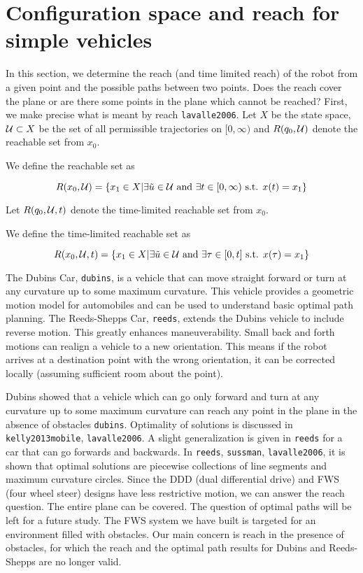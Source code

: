 \hypertarget{configuration-space-and-reach-for-simple-vehicles}{%
\section{Configuration space and reach for simple
vehicles}\label{configuration-space-and-reach-for-simple-vehicles}}

In this section, we determine the reach (and time limited reach) of the
robot from a given point and the possible paths between two points. Does
the reach cover the plane or are there some points in the plane which
cannot be reached? First, we make precise what is meant by reach
\texttt{lavalle2006}. Let \(X\) be the state space,
\({\cal U} \subset X\) be the set of all permissible trajectories on
\([0,\infty)\) and \(R(q_0,{\cal U} )\) denote the reachable set from
\(x_0\).

We define the reachable set as

\[R(x_0,{\cal U} ) = \left\{  x_1 \in X | \exists \tilde{u}\in {\cal U} \mbox{ and } \exists t \in [0,\infty) \mbox{ s.t. } x(t) = x_1 \right\}\]

Let \(R(q_0,{\cal U} ,t)\) denote the time-limited reachable set from
\(x_0\).

We define the time-limited reachable set as

\[R(x_0,{\cal U},t ) = \left\{ x_1 \in X | \exists \tilde{u}\in {\cal U} \mbox{ and } \exists \tau \in [0,t] \mbox{ s.t. } x(\tau) = x_1 \right\}\]

The Dubins Car, \texttt{dubins}, is a vehicle that can move straight
forward or turn at any curvature up to some maximum curvature. This
vehicle provides a geometric motion model for automobiles and can be
used to understand basic optimal path planning. The Reeds-Shepps Car,
\texttt{reeds}, extends the Dubins vehicle to include reverse motion.
This greatly enhances maneuverability. Small back and forth motions can
realign a vehicle to a new orientation. This means if the robot arrives
at a destination point with the wrong orientation, it can be corrected
locally (assuming sufficient room about the point).

Dubins showed that a vehicle which can go only forward and turn at any
curvature up to some maximum curvature can reach any point in the plane
in the absence of obstacles \texttt{dubins}. Optimality of solutions is
discussed in \texttt{kelly2013mobile}, \texttt{lavalle2006}. A slight
generalization is given in \texttt{reeds} for a car that can go forwards
and backwards. In \texttt{reeds}, \texttt{sussman},
\texttt{lavalle2006}, it is shown that optimal solutions are piecewise
collections of line segments and maximum curvature circles. Since the
DDD (dual differential drive) and FWS (four wheel steer) designs have
less restrictive motion, we can answer the reach question. The entire
plane can be covered. The question of optimal paths will be left for a
future study. The FWS system we have built is targeted for an
environment filled with obstacles. Our main concern is reach in the
presence of obstacles, for which the reach and the optimal path results
for Dubins and Reeds-Shepps are no longer valid.

